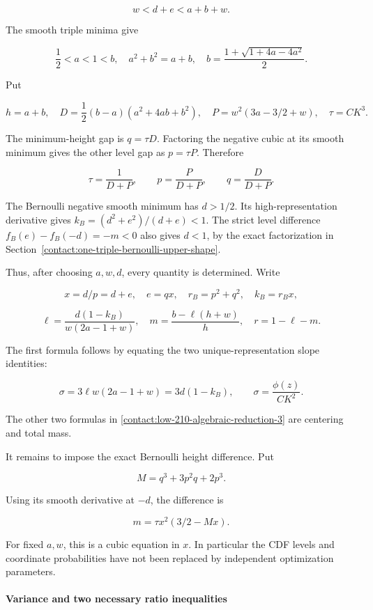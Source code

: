 \[
 w<d+e<a+b+w.
\tag{B.12.1}\label{contact:low-210-algebraic-reduction-1}
\]

The smooth triple minima give

\[
 \frac12<a<1<b,\quad a^2+b^2=a+b,
 \quad b=\frac{1+\sqrt{1+4a-4a^2}}2.
\]

Put

\[
 h=a+b,\quad
 D=\frac12(b-a)(a^2+4ab+b^2),\quad
 P=w^2(3a-3/2+w),\quad \tau=CK^3.
\]

The minimum-height gap is $q=\tau D$. Factoring the negative cubic at
its smooth minimum gives the other level gap as
$p=\tau P$. Therefore

\[
 \boxed{\quad \tau=\frac1{D+P},\qquad
 p=\frac P{D+P},\qquad q=\frac D{D+P}.\quad}
\tag{B.12.2}\label{contact:low-210-algebraic-reduction-2}
\]

The Bernoulli negative smooth minimum has $d>1/2$. Its high-representation
derivative gives $k_B=(d^2+e^2)/(d+e)<1$. The strict level difference
$f_B(e)-f_B(-d)=-m<0$ also gives $d<1$, by the exact factorization
in Section~\ref{contact:one-triple-bernoulli-upper-shape}.

Thus, after choosing $a,w,d$, every quantity is determined. Write

\[
 x=d/p=d+e,\quad e=qx,\quad r_B=p^2+q^2,\quad k_B=r_B x,
\]

\[
 \ell=\frac{d(1-k_B)}{w(2a-1+w)},\quad
 m=\frac{b-\ell(h+w)}h,\quad r=1-\ell-m.
\tag{B.12.3}\label{contact:low-210-algebraic-reduction-3}
\]

The first formula follows by equating the two unique-representation slope
identities:

\[
 \sigma=3\ell w(2a-1+w)=3d(1-k_B),
 \qquad \sigma=\frac{\phi(z)}{CK^2}.
\]

The other two formulas in \eqref{contact:low-210-algebraic-reduction-3} are centering and total mass.

It remains to impose the exact Bernoulli height difference. Put

\[
 M=q^3+3p^2q+2p^3.
\]

Using its smooth derivative at $-d$, the difference is

\[
 \boxed{\quad m=\tau x^2(3/2-Mx).\quad}
\tag{B.12.4}\label{contact:low-210-algebraic-reduction-4}
\]

For fixed $a,w$, this is a cubic equation in $x$. In particular the
CDF levels and coordinate probabilities have not been replaced by
independent optimization parameters.

\paragraph{Variance and two necessary ratio inequalities}

